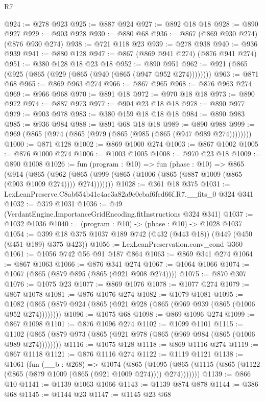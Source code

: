 \begin{lexlean}{R7}
\begin{coremodule}
@924 := @278 @923
@925 := @887 @924
@927 := @892 @18 @18
@928 := @890 @927
@929 := @903 @928
@930 := @880 @68
@936 := @867 (@869 @930 @274) (@876 @930 @274)
@938 := @721 @118 @23
@939 := @278 @938
@940 := @936 @939
@941 := @880 @128
@947 := @867 (@869 @941 @274) (@876 @941 @274)
@951 := @380 @128 @18 @23 @18
@952 := @890 @951
@962 := @921 (@865 (@925 (@865 (@929 (@865 (@940 (@865 (@947 @952 @274))))))))
@963 := @871 @68
@965 := @869 @963 @274
@966 := @867 @965
@968 := @876 @963 @274
@969 := @966 @968
@970 := @891 @18
@972 := @970 @18 @18
@973 := @890 @972
@974 := @887 @973
@977 := @904 @23 @18 @18
@978 := @890 @977
@979 := @903 @978
@983 := @380 @159 @18 @18 @18
@984 := @890 @983
@985 := @936 @984
@988 := @891 @68 @18 @18
@989 := @890 @988
@999 := @969 (@865 (@974 (@865 (@979 (@865 (@985 (@865 (@947 @989 @274))))))))
@1000 := @871 @128
@1002 := @869 @1000 @274
@1003 := @867 @1002
@1005 := @876 @1000 @274
@1006 := @1003 @1005
@1008 := @970 @23 @18
@1009 := @890 @1008
@1026 := fun (program : @10) =>
  fun (phase : @10) =>
  @865
    (@914
      (@865 (@962 (@865 (@999 (@865 (@1006 (@865 (@887 @1009 (@865 (@903 @1009 @274)))) @274)))))))
@1028 := @361 @18 @375
@1031 := LexLeanPreserve.C8ab654b41c4ae3a82a9c0ebaf6fcd66f.R7.__fits_0 @324 @341
@1032 := @379 @1031
@1036 := @49 (VerdantEngine.ImportanceGridEncoding.fitInstructions @324 @341)
@1037 := @1032 @1036
@1040 := (program : @10) -> (phase : @10) -> @1028 @1037
@1054 := @399 @18 @375 @1037 @189 @742 (@432 (@443 @18)) (@449 (@450 (@451 @189) @375 @423))
@1056 := LexLeanPreservation.conv_cond @360
@1061 := @1056 @742 @56 @91 @187 @864
@1063 := @869 @341 @274
@1064 := @867 @1063
@1066 := @876 @341 @274
@1067 := @1064 @1066
@1074 := @1067 (@865 (@879 @895 (@865 (@921 @908 @274))))
@1075 := @870 @307
@1076 := @1075 @23
@1077 := @869 @1076
@1078 := @1077 @274
@1079 := @867 @1078
@1081 := @876 @1076 @274
@1082 := @1079 @1081
@1095 := @1082 (@865 (@879 @924 (@865 (@921 @928 (@865 (@969 @939 (@865 (@1006 @952 @274))))))))
@1096 := @1075 @68
@1098 := @869 @1096 @274
@1099 := @867 @1098
@1101 := @876 @1096 @274
@1102 := @1099 @1101
@1115 := @1102 (@865 (@879 @973 (@865 (@921 @978 (@865 (@969 @984 (@865 (@1006 @989 @274))))))))
@1116 := @1075 @128
@1118 := @869 @1116 @274
@1119 := @867 @1118
@1121 := @876 @1116 @274
@1122 := @1119 @1121
@1138 := @1061
    (fun (__b : @268) =>
    @1074
      (@865
        (@1095 (@865 (@1115 (@865 (@1122 (@865 (@879 @1009 (@865 (@921 @1009 @274)))) @274)))))))
@1139 := @866 @10
@1141 := @1139 @1063 @1066
@1143 := @1139 @874 @878
@1144 := @386 @68
@1145 := @1144 @23
@1147 := @1145 @23 @68

\end{coremodule}
\end{lexlean}
